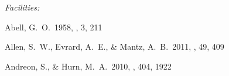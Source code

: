 \documentclass[apj,twocolumn]{emulateapj}
\begin{document}
{%


{\it Facilities:} 










\begin{thebibliography}{88}

 Abell, G.~O.\ 1958, \apjs, 3, 211 

 Allen, S.~W., Evrard, A.~E., \& Mantz, A.~B.\ 2011, \araa, 49, 409 

 Andreon, S., \& Hurn, M.~A.\ 2010, \mnras, 404, 1922 


\end{thebibliography}}
\end{document}
